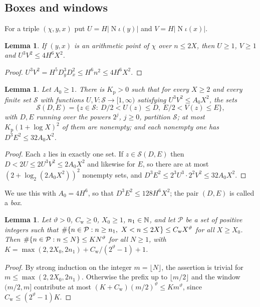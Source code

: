 \documentclass[11pt,reqno]{amsart}
\newtheorem{lemma}[theorem]{Lemma}
\theoremstyle{definition}
\theoremstyle{remark}
\numberwithin{equation}{section}
\newcommand{\Nm}{\operatorname{N}}
\begin{document}
\subsection{Boxes and windows}
For a triple $(\chi,y,x)$ put $U=H|\Nm\iota(y)|$ and $V=H|\Nm\iota(x)|$.
\begin{lemma}\label{lem:norms}
If $(y,x)$ is an arithmetic point of $\chi$ over $n\le2X$, then $U\ge1$,
$V\ge1$ and $U^3V^2\le4H^6X^2$.
\end{lemma}
\begin{proof}
$U^3V^2=H^5D_y^3D_x^2\le H^6n^2\le4H^6X^2$.
\end{proof}

\begin{lemma}\label{lem:partition}
Let $A_0\ge1$. There is $K_{\mathrm p}>0$ such that for every $X\ge2$ and every finite
set $\mathcal S$ with functions $U,V:\mathcal S\to[1,\infty)$ satisfying
$U^3V^2\le A_0X^2$, the sets
\[
 \mathcal S(D,E)=\{z\in\mathcal S:\ D/2<U(z)\le D,\ E/2<V(z)\le E\},
\]
with $D,E$ running over the powers $2^j$, $j\ge0$, partition $\mathcal S$;
at most $K_{\mathrm p}(1+\log X)^2$ of them are nonempty; and each nonempty one has
$D^3E^2\le32A_0X^2$.
\end{lemma}
\begin{proof}
Each $z$ lies in exactly one set. If $z\in\mathcal S(D,E)$ then
$D<2U\le2U^3V^2\le2A_0X^2$ and likewise for $E$, so there are at most
$(2+\log_2(2A_0X^2))^2$ nonempty sets, and
$D^3E^2\le2^3U^3\cdot2^2V^2\le32A_0X^2$.
\end{proof}
We use this with $A_0=4H^6$, so that $D^3E^2\le128H^6X^2$; the pair $(D,E)$
is called a \emph{box}.

\begin{lemma}\label{lem:prefix}
Let $\vartheta>0$, $C_{\mathrm w}\ge0$, $X_0\ge1$, $n_1\in\mathbb N$, and let
$\mathcal P$ be a set of positive integers such that
$\#\{n\in\mathcal P:n\ge n_1,\ X<n\le2X\}\le C_{\mathrm w}X^{\vartheta}$
for all $X\ge X_0$. Then $\#\{n\in\mathcal P:n\le N\}\le KN^{\vartheta}$
for all $N\ge1$, with
$K=\max(2,2X_0,2n_1)+C_{\mathrm w}/(2^{\vartheta}-1)+1$.
\end{lemma}
\begin{proof}
By strong induction on the integer $m=\lfloor N\rfloor$, the assertion
is trivial for $m\le\max(2,2X_0,2n_1)$. Otherwise the prefix up to
$\lfloor m/2\rfloor$ and the window $(m/2,m]$ contribute at most
$(K+C_{\mathrm w})(m/2)^\vartheta\le Km^\vartheta$, since
$C_{\mathrm w}\le(2^\vartheta-1)K$.
\end{proof}
\end{document}
